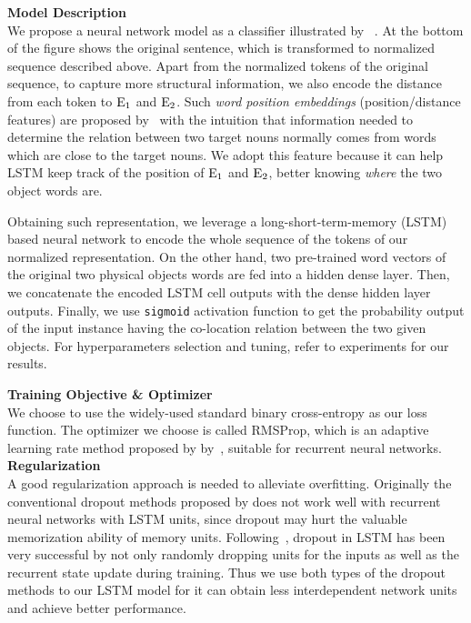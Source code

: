 \noindent \textbf{Model Description}
\\
We propose a neural network model as a classifier illustrated by ~.
At the bottom of the figure shows the original sentence, which is transformed to normalized sequence described above.
Apart from the normalized tokens of the original sequence, to capture more structural information, we also encode the distance from each token to $\textnormal E_1$ and $\textnormal E_2$.
Such \textit{word position embeddings} (position/distance features) are proposed by~\citeauthor{zeng2014relation} with the intuition that information needed to determine the relation between two target nouns normally comes from words which are close to the target nouns. We adopt this feature because it can help LSTM keep track of the position of $\textnormal E_1$ and $\textnormal E_2$, better knowing \textit{where} the two object words are.

Obtaining such representation, we leverage a long-short-term-memory (LSTM) based neural network to encode the whole sequence of the tokens of our normalized representation. On the other hand, two pre-trained word vectors of the original two physical objects words are fed into a hidden dense layer. 
Then, we concatenate the encoded LSTM cell outputs with the dense hidden layer outputs.
Finally, we use \texttt{sigmoid} activation function to get the 
probability output of the input instance having the co-location relation 
between the two given objects. For hyperparameters selection and tuning, refer to experiments for our results.

\noindent \textbf{Training Objective \& Optimizer}\\
We choose to use the widely-used standard binary cross-entropy as our loss function.
The optimizer we choose is called RMSProp, which is an adaptive learning rate method proposed by by~\citeauthor{hinton2012neural}, suitable for recurrent neural networks.\\
\noindent
\textbf{Regularization}\\
A good regularization approach is needed to alleviate overfitting. Originally the conventional dropout methods proposed by \citeauthor{hinton2012improving} does not work well with recurrent neural networks with LSTM units, since dropout may hurt the valuable memorization ability of memory units. Following~\citeauthor{zaremba2014recurrent}, dropout in LSTM has been very successful by not only randomly dropping units for the inputs as well as the recurrent state update during training. Thus we use both types of the dropout methods to our LSTM model for it can obtain less interdependent network units and achieve better performance.

